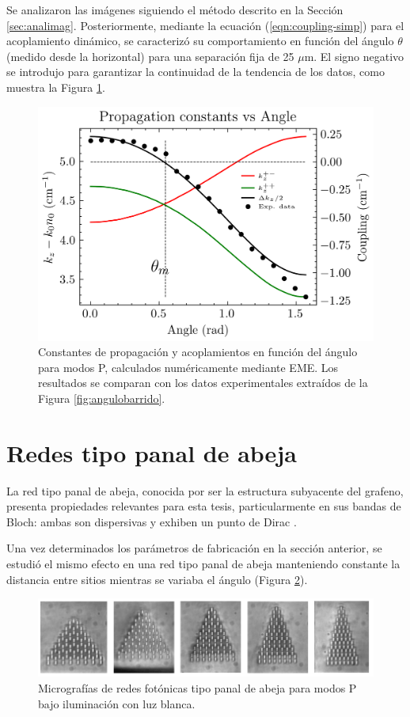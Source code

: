 Se analizaron las imágenes siguiendo el método descrito en la Sección \ref{sec:analimag}. Posteriormente, mediante la ecuación (\ref{eqn:coupling-simp}) para el acoplamiento dinámico, se caracterizó su comportamiento en función del ángulo $\theta$ (medido desde la horizontal) para una separación fija de 25 $\mu$m. El signo negativo se introdujo para garantizar la continuidad de la tendencia de los datos, como muestra la Figura \ref{fig:invisibility-coup}.

\begin{figure}[H]
    \centering
    \includegraphics[width=0.7\linewidth]{codigo/eigenvalues_vs_angle.png}
    \caption[Constantes de propagación y acoplamientos angulares para modos P]{Constantes de propagación y acoplamientos en función del ángulo para modos P, calculados numéricamente mediante EME. Los resultados se comparan con los datos experimentales extraídos de la Figura \ref{fig:angulobarrido}. \label{fig:invisibility-coup}}
\end{figure}

\section{Redes tipo panal de abeja}

La red tipo panal de abeja, conocida por ser la estructura subyacente del grafeno, presenta propiedades relevantes para esta tesis, particularmente en sus bandas de Bloch: ambas son dispersivas y exhiben un punto de Dirac \citep{honeycombdirac}.

Una vez determinados los parámetros de fabricación en la sección anterior, se estudió el mismo efecto en una red tipo panal de abeja manteniendo constante la distancia entre sitios mientras se variaba el ángulo (Figura \ref{fig:HCLBW}).

\begin{figure}[H]
    \centering
    \includegraphics[width=\linewidth]{media/honeycomb_lattices_bw.png}
    \caption[Micrografías de redes fotónicas tipo panal de abeja para modos P]{Micrografías de redes fotónicas tipo panal de abeja para modos P bajo iluminación con luz blanca. \label{fig:HCLBW}}
\end{figure}

